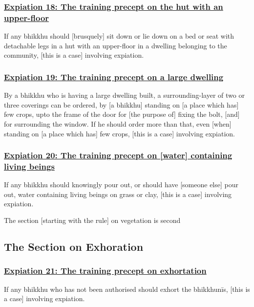 \subsubsection*{\hyperref[pac18]{Expiation 18: The training precept on the hut with an upper-floor}}
\label{exp18}
If any bhikkhu should [brusquely] sit down or lie down on a bed or seat with detachable legs in a hut with an upper-floor in a dwelling belonging to the community, [this is a case] involving expiation.



\subsubsection*{\hyperref[pac19]{Expiation 19: The training precept on a large dwelling}}
\label{exp19}
By a bhikkhu who is having a large dwelling built, a surrounding-layer of two or three coverings can be ordered, by [a bhikkhu] standing on [a place which has] few crops, upto the frame of the door for [the purpose of] fixing the bolt, [and] for surrounding the window. If he should order more than that, even [when] standing on [a place which has] few crops, [this is a case] involving expiation.



\subsubsection*{\hyperref[pac20]{Expiation 20: The training precept on [water] containing living beings}}
\label{exp20}
If any bhikkhu should knowingly pour out, or should have [someone else] pour out, water containing living beings on grass or clay, [this is a case] involving expiation.

\begin{center}
	The section [starting with the rule] on vegetation is second
\end{center}



\setsubsecheadstyle{\subsectionFmt}
\subsection{The Section on Exhoration}

\subsubsection*{\hyperref[pac21]{Expiation 21: The training precept on exhortation}}
\label{exp21}
If any bhikkhu who has not been authorised should exhort the bhikkhunīs, [this is a case] involving expiation.



